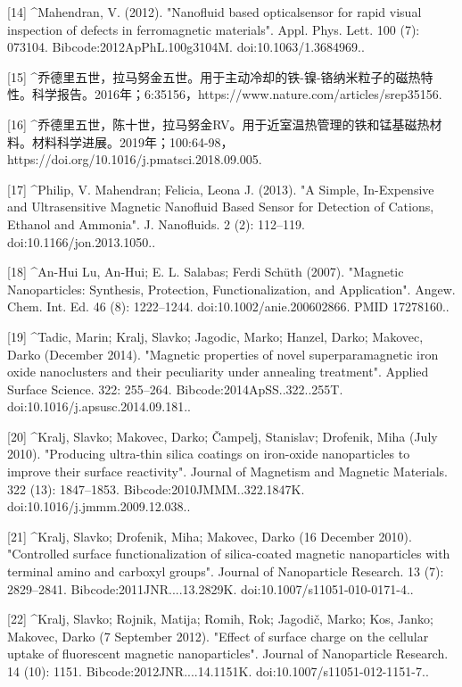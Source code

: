 [14]
^Mahendran, V. (2012). "Nanofluid based opticalsensor for rapid visual inspection of defects in ferromagnetic materials". Appl. Phys. Lett. 100 (7): 073104. Bibcode:2012ApPhL.100g3104M. doi:10.1063/1.3684969..

[15]
^乔德里五世，拉马努金五世。用于主动冷却的铁-镍-铬纳米粒子的磁热特性。科学报告。2016年；6:35156，https://www.nature.com/articles/srep35156.

[16]
^乔德里五世，陈十世，拉马努金RV。用于近室温热管理的铁和锰基磁热材料。材料科学进展。2019年；100:64-98，https://doi.org/10.1016/j.pmatsci.2018.09.005.

[17]
^Philip, V. Mahendran; Felicia, Leona J. (2013). "A Simple, In-Expensive and Ultrasensitive Magnetic Nanofluid Based Sensor for Detection of Cations, Ethanol and Ammonia". J. Nanofluids. 2 (2): 112–119. doi:10.1166/jon.2013.1050..

[18]
^An-Hui Lu, An-Hui; E. L. Salabas; Ferdi Schüth (2007). "Magnetic Nanoparticles: Synthesis, Protection, Functionalization, and Application". Angew. Chem. Int. Ed. 46 (8): 1222–1244. doi:10.1002/anie.200602866. PMID 17278160..

[19]
^Tadic, Marin; Kralj, Slavko; Jagodic, Marko; Hanzel, Darko; Makovec, Darko (December 2014). "Magnetic properties of novel superparamagnetic iron oxide nanoclusters and their peculiarity under annealing treatment". Applied Surface Science. 322: 255–264. Bibcode:2014ApSS..322..255T. doi:10.1016/j.apsusc.2014.09.181..

[20]
^Kralj, Slavko; Makovec, Darko; Čampelj, Stanislav; Drofenik, Miha (July 2010). "Producing ultra-thin silica coatings on iron-oxide nanoparticles to improve their surface reactivity". Journal of Magnetism and Magnetic Materials. 322 (13): 1847–1853. Bibcode:2010JMMM..322.1847K. doi:10.1016/j.jmmm.2009.12.038..

[21]
^Kralj, Slavko; Drofenik, Miha; Makovec, Darko (16 December 2010). "Controlled surface functionalization of silica-coated magnetic nanoparticles with terminal amino and carboxyl groups". Journal of Nanoparticle Research. 13 (7): 2829–2841. Bibcode:2011JNR....13.2829K. doi:10.1007/s11051-010-0171-4..

[22]
^Kralj, Slavko; Rojnik, Matija; Romih, Rok; Jagodič, Marko; Kos, Janko; Makovec, Darko (7 September 2012). "Effect of surface charge on the cellular uptake of fluorescent magnetic nanoparticles". Journal of Nanoparticle Research. 14 (10): 1151. Bibcode:2012JNR....14.1151K. doi:10.1007/s11051-012-1151-7..

